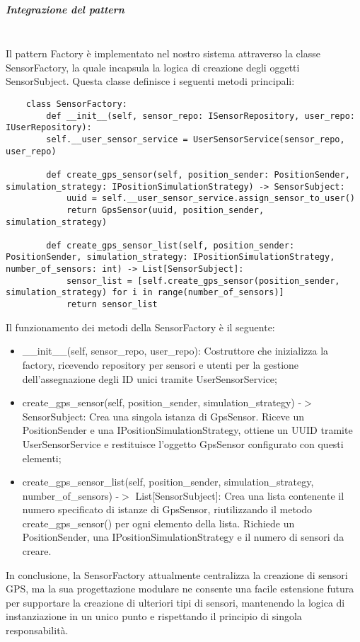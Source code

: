 \documentclass[10pt]{article}
\newcommand{\mysubparagraph}[1]{\subparagraph{#1}\mbox{}\\}
\begin{document}
    \mysubparagraph{Integrazione del pattern}
    Il pattern Factory è implementato nel nostro sistema attraverso la classe SensorFactory, la quale incapsula la logica di creazione degli oggetti SensorSubject. Questa classe definisce i seguenti metodi principali:
    \begin{lstlisting}
    class SensorFactory:
        def __init__(self, sensor_repo: ISensorRepository, user_repo: IUserRepository):
        self.__user_sensor_service = UserSensorService(sensor_repo, user_repo)

        def create_gps_sensor(self, position_sender: PositionSender, simulation_strategy: IPositionSimulationStrategy) -> SensorSubject:
            uuid = self.__user_sensor_service.assign_sensor_to_user()
            return GpsSensor(uuid, position_sender, simulation_strategy)
            
        def create_gps_sensor_list(self, position_sender: PositionSender, simulation_strategy: IPositionSimulationStrategy, number_of_sensors: int) -> List[SensorSubject]:
            sensor_list = [self.create_gps_sensor(position_sender, simulation_strategy) for i in range(number_of_sensors)]
            return sensor_list
    \end{lstlisting}
    Il funzionamento dei metodi della SensorFactory è il seguente:
    \begin{itemize}
        \item \_\_init\_\_(self, sensor\_repo, user\_repo): Costruttore che inizializza la factory, ricevendo repository per sensori e utenti per la gestione dell'assegnazione degli ID unici tramite UserSensorService;
        \item create\_gps\_sensor(self, position\_sender, simulation\_strategy) -$>$ SensorSubject: Crea una singola istanza di GpsSensor. Riceve un PositionSender e una IPositionSimulationStrategy, ottiene un UUID tramite UserSensorService e restituisce l'oggetto GpsSensor configurato con questi elementi;
        \item create\_gps\_sensor\_list(self, position\_sender, simulation\_strategy, number\_of\_sensors) -$>$ List[SensorSubject]: Crea una lista contenente il numero specificato di istanze di GpsSensor, riutilizzando il metodo create\_gps\_sensor() per ogni elemento della lista. Richiede un PositionSender, una IPositionSimulationStrategy e il numero di sensori da creare.
    \end{itemize}
In conclusione, la SensorFactory attualmente centralizza la creazione di sensori GPS, ma la sua progettazione modulare ne consente una facile estensione futura per supportare la creazione di ulteriori tipi di sensori, mantenendo la logica di instanziazione in un unico punto e rispettando il principio di singola responsabilità.
\end{document}
